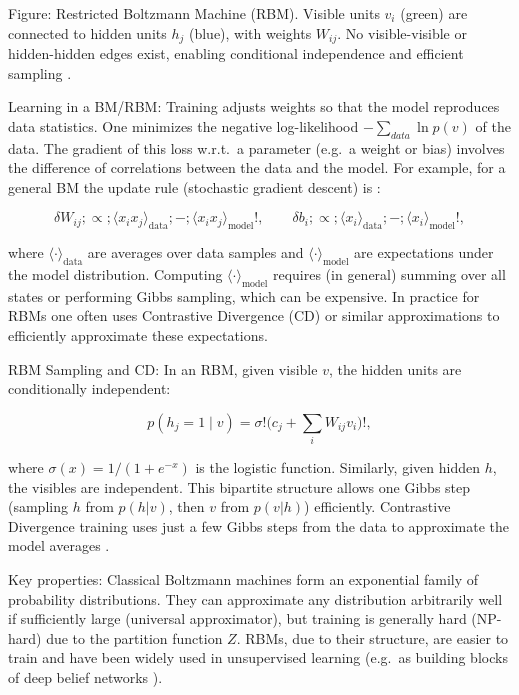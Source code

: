 Figure: Restricted Boltzmann Machine (RBM). Visible units $v_i$ (green) are connected to hidden units $h_j$ (blue), with weights $W_{ij}$. No visible-visible or hidden-hidden edges exist, enabling conditional independence and efficient sampling .



Learning in a BM/RBM: Training adjusts weights so that the model reproduces data statistics. One minimizes the negative log-likelihood $-\sum_{data}\ln p(v)$ of the data. The gradient of this loss w.r.t.\ a parameter (e.g.\ a weight or bias) involves the difference of correlations between the data and the model. For example, for a general BM the update rule (stochastic gradient descent) is :

$$

\delta W_{ij} ;\propto; \langle x_i x_j\rangle_{\text{data}} ;-; \langle x_i x_j\rangle_{\text{model}}!, \qquad

\delta b_{i} ;\propto; \langle x_i \rangle_{\text{data}} ;-; \langle x_i \rangle_{\text{model}}!,

$$

where $\langle\cdot\rangle_{\text{data}}$ are averages over data samples and $\langle\cdot\rangle_{\text{model}}$ are expectations under the model distribution. Computing $\langle\cdot\rangle_{\text{model}}$ requires (in general) summing over all states or performing Gibbs sampling, which can be expensive. In practice for RBMs one often uses Contrastive Divergence (CD) or similar approximations to efficiently approximate these expectations.



RBM Sampling and CD: In an RBM, given visible $v$, the hidden units are conditionally independent:

$$

p(h_j=1\mid v) = \sigma!\bigl(c_j + \sum_i W_{ij} v_i\bigr)!,

$$

where $\sigma(x) = 1/(1+e^{-x})$ is the logistic function. Similarly, given hidden $h$, the visibles are independent. This bipartite structure allows one Gibbs step (sampling $h$ from $p(h|v)$, then $v$ from $p(v|h)$) efficiently. Contrastive Divergence training uses just a few Gibbs steps from the data to approximate the model averages .



Key properties: Classical Boltzmann machines form an exponential family of probability distributions. They can approximate any distribution arbitrarily well if sufficiently large (universal approximator), but training is generally hard (NP-hard) due to the partition function $Z$. RBMs, due to their structure, are easier to train and have been widely used in unsupervised learning (e.g.\ as building blocks of deep belief networks ).



